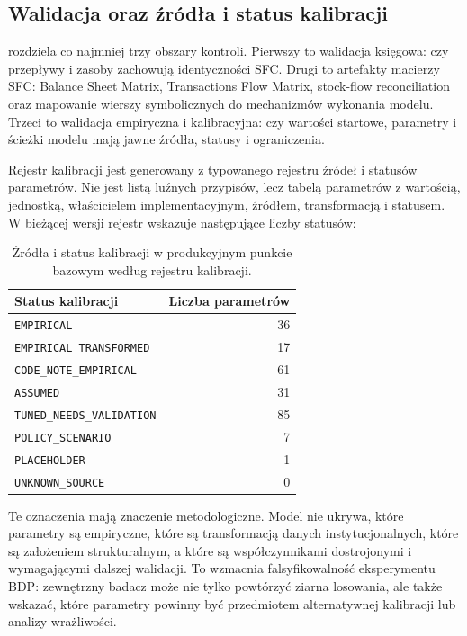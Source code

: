 \subsection{Walidacja oraz źródła i status kalibracji}

\amor{} rozdziela co najmniej trzy obszary kontroli. Pierwszy to walidacja księgowa: czy przepływy i zasoby zachowują identyczności SFC. Drugi to artefakty macierzy SFC: Balance Sheet Matrix, Transactions Flow Matrix, stock-flow reconciliation oraz mapowanie wierszy symbolicznych do mechanizmów wykonania modelu. Trzeci to walidacja empiryczna i kalibracyjna: czy wartości startowe, parametry i ścieżki modelu mają jawne źródła, statusy i ograniczenia.

Rejestr kalibracji  jest generowany z typowanego rejestru źródeł i statusów parametrów. Nie jest listą luźnych przypisów, lecz tabelą parametrów z wartością, jednostką, właścicielem implementacyjnym, źródłem, transformacją i statusem. W bieżącej wersji rejestr wskazuje następujące liczby statusów:

\begin{table}[htbp]
\centering
\scriptsize
\begin{tabular}{@{}lr@{}}
\toprule
\textbf{Status kalibracji} & \textbf{Liczba parametrów} \\
\midrule
\texttt{EMPIRICAL} & 36 \\
\texttt{EMPIRICAL\_TRANSFORMED} & 17 \\
\texttt{CODE\_NOTE\_EMPIRICAL} & 61 \\
\texttt{ASSUMED} & 31 \\
\texttt{TUNED\_NEEDS\_VALIDATION} & 85 \\
\texttt{POLICY\_SCENARIO} & 7 \\
\texttt{PLACEHOLDER} & 1 \\
\texttt{UNKNOWN\_SOURCE} & 0 \\
\bottomrule
\end{tabular}
\caption{Źródła i status kalibracji w produkcyjnym punkcie bazowym \amor{} według rejestru kalibracji.}
\label{tab:calibration-provenance}
\end{table}

Te oznaczenia mają znaczenie metodologiczne. Model nie ukrywa, które parametry są empiryczne, które są transformacją danych instytucjonalnych, które są założeniem strukturalnym, a które są współczynnikami dostrojonymi i wymagającymi dalszej walidacji. To wzmacnia falsyfikowalność eksperymentu BDP: zewnętrzny badacz może nie tylko powtórzyć ziarna losowania, ale także wskazać, które parametry powinny być przedmiotem alternatywnej kalibracji lub analizy wrażliwości.

